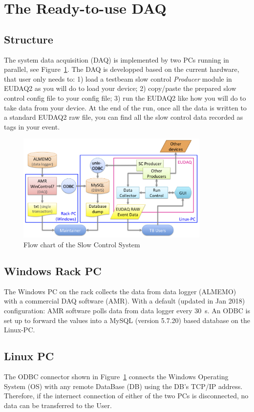 \documentclass[a4paper,12pt]{scrartcl}
\begin{document}
\section{The Ready-to-use DAQ}
\subsection{Structure}
The system data acquisition (DAQ) is implemented by two PCs running in parallel, see Figure~\ref{fig:DAQflow}.
The DAQ is developped based on the current hardware, that user only needs to: 1) load a testbeam slow control \textit{Producer} module in EUDAQ2 as you will do to load your device; 2) copy/paste the prepared slow control config file to your config file; 3) run the EUDAQ2 like how you will do to take data from your device. At the end of the run, once all the data is written to a standard EUDAQ2 raw file, you can find all the slow control data recorded as tags in your event.

\begin{figure}[!ht] \centering
\includegraphics[width=0.85\textwidth]{FlowChartSCS.png}
\caption{Flow chart of the Slow Control System}
\label{fig:DAQflow}
\end{figure}

\subsection{Windows Rack PC}
The Windows PC on the rack collects the data from data logger (ALMEMO) with a commercial DAQ software (AMR).
With a default (updated in Jan 2018) configuration: AMR software polls data from data logger every \SI{30}{s}.
An ODBC is set up to forward the values into a MySQL (version 5.7.20) based database on the Linux-PC.

\subsection{Linux PC}
The ODBC connector shown in Figure~\ref{fig:DAQflow} connects the Windows Operating System (OS) with any remote DataBase (DB) using the DB's TCP/IP address. Therefore, if the internect connection of either of the two PCs is disconnected, no data can be transferred to the User.
\end{document}
